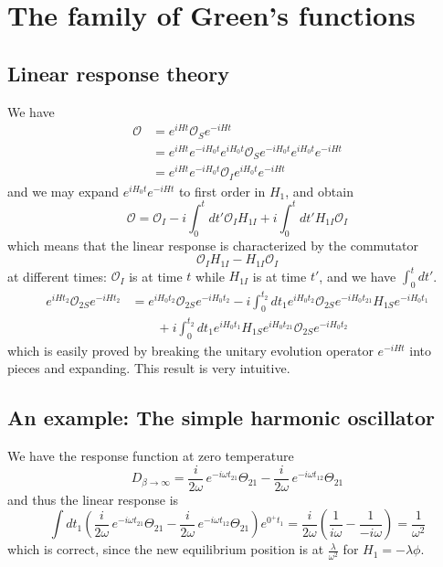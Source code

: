 \documentclass[12pt, oneside]{book}
\begin{document}
\chapter{The family of Green's functions}
\section*{Linear response theory}
We have
\begin{align*}
\mathcal{O}
&=e^{iHt}\mathcal{O}_Se^{-iHt}\\
&=e^{iHt}e^{-iH_0t}e^{iH_0t}\mathcal{O}_Se^{-iH_0t}e^{iH_0t}e^{-iHt}\\
&=e^{iHt}e^{-iH_0t}\mathcal{O}_Ie^{iH_0t}e^{-iHt}
\end{align*}
and we may expand $e^{iH_0t}e^{-iHt}$ to first order in $H_1$, and obtain
\[
\mathcal{O}=\mathcal{O}_I-i\int_0^tdt'\mathcal{O}_IH_{1I}+i\int_0^tdt'H_{1I}\mathcal{O}_I
\]
which means that the linear response is characterized by the commutator
\[
\mathcal{O}_IH_{1I}-H_{1I}\mathcal{O}_I
\]
at different times: $\mathcal{O}_I$ is at time $t$ while $H_{1I}$ is at time $t'$, and we have $\int_0^tdt'$.
\begin{align*}
	e^{iHt_2}\mathcal{O}_{2S}e^{-iHt_2}
	&=e^{iH_0t_2}\mathcal{O}_{2S}e^{-iH_0t_2}-i\int_0^{t_2}dt_1e^{iH_0t_2}\mathcal{O}_{2S}e^{-iH_0t_{21}}H_{1S}e^{-iH_0t_1}\\
	&\qquad+i\int_0^{t_2}dt_1e^{iH_0t_1}H_{1S}e^{iH_0t_{21}}\mathcal{O}_{2S}e^{-iH_0t_2}
\end{align*}
which is easily proved by breaking the unitary evolution operator $e^{-iHt}$ into pieces and expanding. This result is very intuitive.

\section*{An example: The simple harmonic oscillator}
We have the response function at zero temperature
\[
D_{\beta\to\infty}=\frac{i}{2\omega}\,e^{-i\omega t_{21}}\Theta_{21}-\frac{i}{2\omega}\,e^{-i\omega t_{12}}\Theta_{21}
\]
and thus the linear response is
\[
\int dt_1\left(\frac{i}{2\omega}\,e^{-i\omega t_{21}}\Theta_{21}-\frac{i}{2\omega}\,e^{-i\omega t_{12}}\Theta_{21}\right)e^{0^+t_1}=\frac{i}{2\omega}\left(\frac1{i\omega}-\frac1{-i\omega}\right)=\frac1{\omega^2}
\]
which is correct, since the new equilibrium position is at $\frac{\lambda}{\omega^2}$ for $H_1=-\lambda\phi$.
\end{document}
